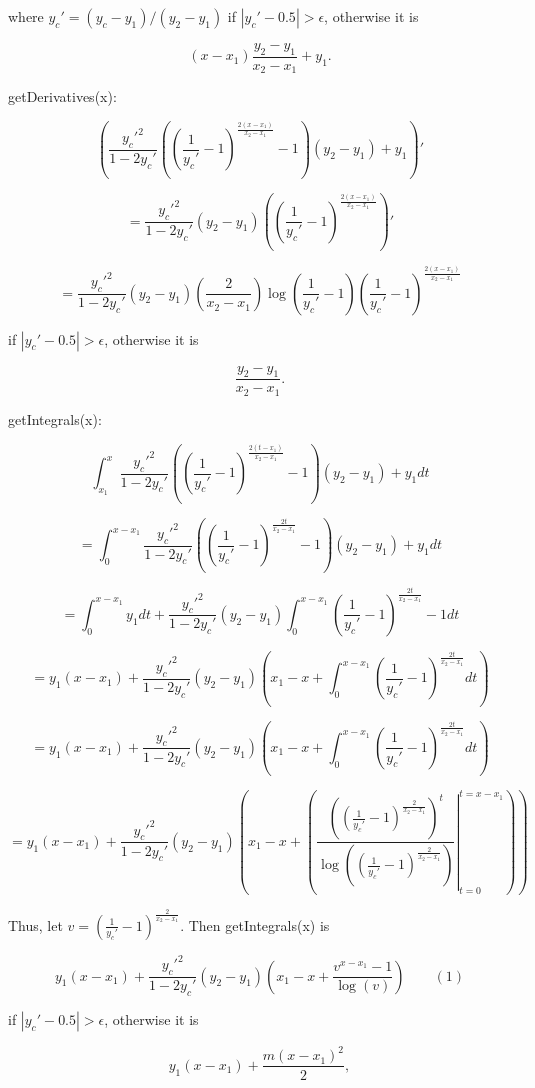 \documentclass{article}
\begin{document}
{where $y_c'=(y_c-y_1)/(y_2-y_1)$ if $|y_c'-0.5| > \epsilon$, otherwise it is

$$(x-x_1)\frac{y_2-y_1}{x_2-x_1} + y_1.$$

getDerivatives(x): 

$$\left(\frac{y_c'^2}{1-2y_c'}\left(\left(\frac{1}{y_c'}-1\right)^{\frac{2(x-x_1)}{x_2-x_1}}-1\right)(y_2-y_1)+y_1\right)'$$

$$=\frac{y_c'^2}{1-2y_c'}\left(y_2-y_1\right)\left(\left(\frac{1}{y_c'}-1\right)^{\frac{2\left(x-x_1\right)}{x_2-x_1}}\right)'$$

$$=\boxed{\frac{y_c'^2}{1-2y_c'}\left(y_2-y_1\right)\left(\frac{2}{x_2-x_1}\right)\log\left(\frac{1}{y_c'}-1\right)\left(\frac{1}{y_c'}-1\right)^{\frac{2(x-x_1)}{x_2-x_1}}}$$

if $|y_c'-0.5| > \epsilon$, otherwise it is

$$\frac{y_2-y_1}{x_2-x_1}.$$

getIntegrals(x):

$$\int_{x_1}^{x}\frac{y_c'^2}{1-2y_c'}\left(\left(\frac{1}{y_c'}-1\right)^{\frac{2(t-x_1)}{x_2-x_1}}-1\right)(y_2-y_1)+y_1 dt$$

$$=\int_{0}^{x-x_1}\frac{y_c'^2}{1-2y_c'}\left(\left(\frac{1}{y_c'}-1\right)^{\frac{2t}{x_2-x_1}}-1\right)(y_2-y_1)+y_1 dt$$

$$=\int_{0}^{x-x_1}y_1 dt + \frac{y_c'^2}{1-2y_c'} (y_2-y_1) \int_{0}^{x-x_1} \left(\frac{1}{y_c'}-1\right)^{\frac{2t}{x_2-x_1}}-1 dt$$

$$=y_1(x-x_1)+\frac{y_c'^2}{1-2y_c'} (y_2-y_1)\left(x_1 - x + \int_{0}^{x-x_1} \left(\frac{1}{y_c'}-1\right)^{\frac{2t}{x_2-x_1}}dt\right)$$

$$=y_1(x-x_1)+\frac{y_c'^2}{1-2y_c'} (y_2-y_1)\left(x_1 - x + \int_{0}^{x-x_1} \left(\frac{1}{y_c'}-1\right)^{\frac{2t}{x_2-x_1}}dt\right)$$

$$=y_1(x-x_1)+\frac{y_c'^2}{1-2y_c'}(y_2-y_1) \left(x_1 - x + \left(\left. \frac{\left(\left(\frac{1}{y_c'}-1\right)^\frac{2}{x_2-x_1}\right)^t}{\log\left(\left(\frac{1}{y_c'}-1\right)^\frac{2}{x_2-x_1}\right)} \right\vert_{t=0}^{t=x-x_1}\right)\right)$$

Thus, let $v = \left(\frac{1}{y_c'}-1\right)^\frac{2}{x_2-x_1}$. Then getIntegrals(x) is

$$\boxed{y_1(x-x_1)+\frac{y_c'^2}{1-2y_c'} (y_2-y_1)\left(x_1 - x + \frac{v^{x-x_1}-1}{\log(v)}\right)}\qquad (1)$$

if $|y_c'-0.5| > \epsilon$, otherwise it is

$$y_1(x-x_1) + \frac{m(x-x_1)^2}{2},$$

}
\end{document}
